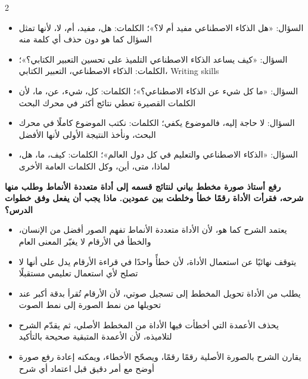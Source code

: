 \documentclass[10pt,a4paper]{article}
\begin{document}
\begin{multicols}{2}
\begin{minipage}{\linewidth}
\begin{itemize}[leftmargin=0.95cm, labelsep=4pt, itemsep=1pt, topsep=3pt, parsep=0pt]
  \item[\textbf{أ)}] السؤال: «هل الذكاء الاصطناعي مفيد أم لا؟»؛ الكلمات: هل، مفيد، أم، لا، لأنها تمثل السؤال كما هو دون حذف أي كلمة منه
  \item[\textbf{ب)}] السؤال: «كيف يساعد الذكاء الاصطناعي التلميذ على تحسين التعبير الكتابي؟»؛ الكلمات: الذكاء الاصطناعي، التعبير الكتابي، \textenglish{Writing skills}
  \item[\textbf{ج)}] السؤال: «ما كل شيء عن الذكاء الاصطناعي؟»؛ الكلمات: كل، شيء، عن، ما، لأن الكلمات القصيرة تعطي نتائج أكثر في محرك البحث
  \item[\textbf{د)}] السؤال: لا حاجة إليه، فالموضوع يكفي؛ الكلمات: نكتب الموضوع كاملًا في محرك البحث، ونأخذ النتيجة الأولى لأنها الأفضل
  \item[\textbf{هـ)}] السؤال: «الذكاء الاصطناعي والتعليم في كل دول العالم»؛ الكلمات: كيف، ما، هل، لماذا، متى، أين، وكل الكلمات العامة الأخرى
\end{itemize}
\end{minipage}\par\vspace{8pt plus 6pt}
\noindent\begin{minipage}{\linewidth}
\hangindent=0.7cm\textbf{رفع أستاذ صورة مخطط بياني لنتائج قسمه إلى أداة متعددة الأنماط وطلب منها شرحه، فقرأت الأداة رقمًا خطأ وخلطت بين عمودين. ماذا يجب أن يفعل وفق خطوات الدرس؟}
\begin{itemize}[leftmargin=0.95cm, labelsep=4pt, itemsep=1pt, topsep=3pt, parsep=0pt]
  \item[\textbf{أ)}] يعتمد الشرح كما هو، لأن الأداة متعددة الأنماط تفهم الصور أفضل من الإنسان، والخطأ في الأرقام لا يغيّر المعنى العام
  \item[\textbf{ب)}] يتوقف نهائيًا عن استعمال الأداة، لأن خطأً واحدًا في قراءة الأرقام يدل على أنها لا تصلح لأي استعمال تعليمي مستقبلًا
  \item[\textbf{ج)}] يطلب من الأداة تحويل المخطط إلى تسجيل صوتي، لأن الأرقام تُقرأ بدقة أكبر عند تحويلها من نمط الصورة إلى نمط الصوت
  \item[\textbf{د)}] يحذف الأعمدة التي أخطأت فيها الأداة من المخطط الأصلي، ثم يقدّم الشرح لتلاميذه، لأن الأعمدة المتبقية صحيحة بالتأكيد
  \item[\textbf{هـ)}] يقارن الشرح بالصورة الأصلية رقمًا رقمًا، ويصحّح الأخطاء، ويمكنه إعادة رفع صورة أوضح مع أمر دقيق قبل اعتماد أي شرح
\end{itemize}
\end{minipage}\par\vspace{8pt plus 6pt}

\end{multicols}
\end{document}
